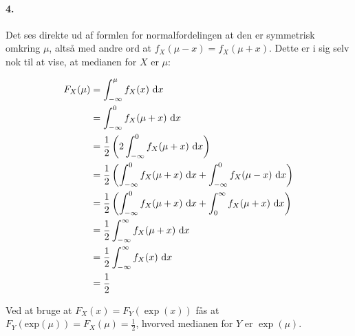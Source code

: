 \paragraph{4.} Det ses direkte ud af formlen for normalfordelingen at den er
symmetrisk omkring $\mu$, altså med andre ord at $f_X(\mu - x) = f_X(\mu + x)$.
Dette er i sig selv nok til at vise, at medianen for $X$ er $\mu$:

\begin{align*}
F_X(\mu) &= \int_{-\infty}^\mu f_X(x)\ \mathrm{d} x \\
&=\int_{-\infty}^0 f_X(\mu + x)\ \mathrm{d} x \\
&=\frac{1}{2}\left(2\int_{-\infty}^0 f_X(\mu + x)\ \mathrm{d} x\right) \\
&=\frac{1}{2}\left(\int_{-\infty}^0 f_X(\mu + x)\ \mathrm{d} x + \int_{-\infty}^0 f_X(\mu - x)\ \mathrm{d} x\right) \\
&=\frac{1}{2}\left(\int_{-\infty}^0 f_X(\mu + x)\ \mathrm{d} x + \int_0^\infty f_X(\mu + x)\ \mathrm{d} x\right) \\
&=\frac{1}{2}\int_{-\infty}^\infty f_X(\mu + x)\ \mathrm{d} x \\
&=\frac{1}{2}\int_{-\infty}^\infty f_X(x)\ \mathrm{d} x \\
&=\frac{1}{2}
\end{align*}

Ved at bruge at $F_X(x) = F_Y(\exp(x))$ fås at $F_Y(\mathrm{exp}(\mu))
= F_X(\mu) = \frac{1}{2}$, hvorved medianen for $Y$ er $\exp(\mu)$.
